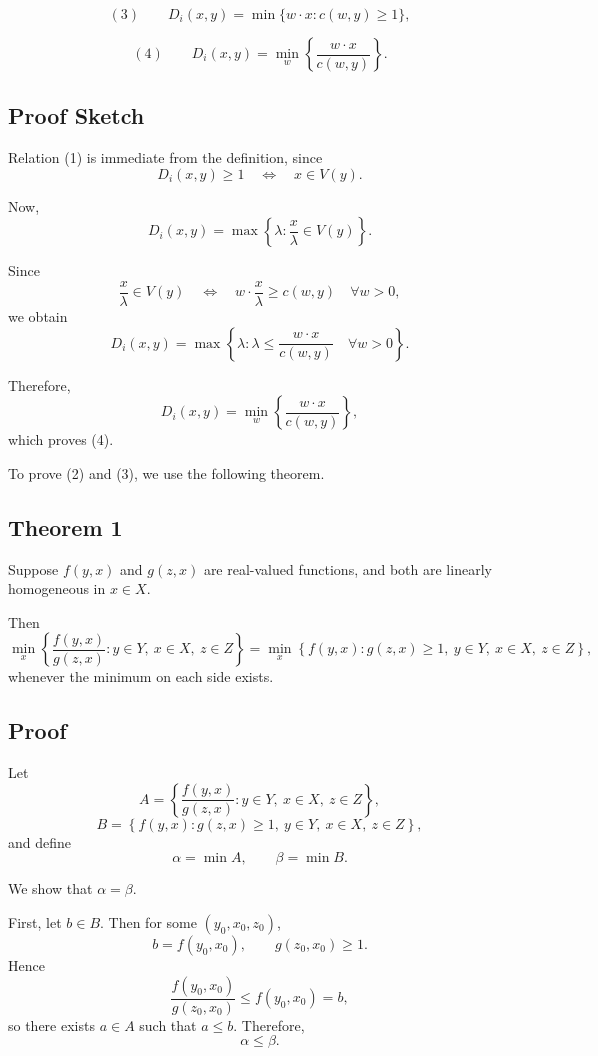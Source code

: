 \[
(3)\qquad
D_i(x,y)
=
\min \{ w\cdot x : c(w,y)\ge 1\},
\]

\[
(4)\qquad
D_i(x,y)
=
\min_w \left\{ \frac{w\cdot x}{c(w,y)} \right\}.
\]

\subsection*{Proof Sketch}

Relation (1) is immediate from the definition, since
\[
D_i(x,y)\ge 1
\quad \Longleftrightarrow \quad
x \in V(y).
\]

Now,
\[
D_i(x,y)
=
\max \left\{ \lambda : \frac{x}{\lambda}\in V(y) \right\}.
\]

Since
\[
\frac{x}{\lambda}\in V(y)
\quad \Longleftrightarrow \quad
w\cdot \frac{x}{\lambda} \ge c(w,y)
\quad \forall w>0,
\]
we obtain
\[
D_i(x,y)
=
\max \left\{ \lambda : \lambda \le \frac{w\cdot x}{c(w,y)}
\quad \forall w>0 \right\}.
\]

Therefore,
\[
D_i(x,y)
=
\min_w \left\{ \frac{w\cdot x}{c(w,y)} \right\},
\]
which proves (4).

\medskip

To prove (2) and (3), we use the following theorem.

\subsection*{Theorem 1}

Suppose $f(y,x)$ and $g(z,x)$ are real-valued functions, and both are
linearly homogeneous in $x\in X$.

Then
\[
\min_x \left\{
\frac{f(y,x)}{g(z,x)} : y\in Y,\ x\in X,\ z\in Z
\right\}
=
\min_x \left\{
f(y,x) : g(z,x)\ge 1,\ y\in Y,\ x\in X,\ z\in Z
\right\},
\]
whenever the minimum on each side exists.

\subsection*{Proof}

Let
\[
A
=
\left\{
\frac{f(y,x)}{g(z,x)} : y\in Y,\ x\in X,\ z\in Z
\right\},
\]
\[
B
=
\left\{
f(y,x) : g(z,x)\ge 1,\ y\in Y,\ x\in X,\ z\in Z
\right\},
\]
and define
\[
\alpha = \min A,
\qquad
\beta = \min B.
\]

We show that $\alpha=\beta$.

\medskip

First, let $b\in B$. Then for some $(y_0,x_0,z_0)$,
\[
b=f(y_0,x_0),
\qquad
g(z_0,x_0)\ge 1.
\]
Hence
\[
\frac{f(y_0,x_0)}{g(z_0,x_0)} \le f(y_0,x_0)=b,
\]
so there exists $a\in A$ such that $a\le b$.
Therefore,
\[
\alpha \le \beta.
\]

